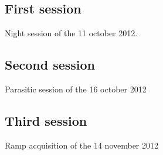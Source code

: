    \subsection{First session}
   
   Night session of the 11 october 2012.

   \subsection{Second session}
   
   Parasitic session of the 16 october 2012

   \subsection{Third session}

   Ramp acquisition of the 14 november 2012

